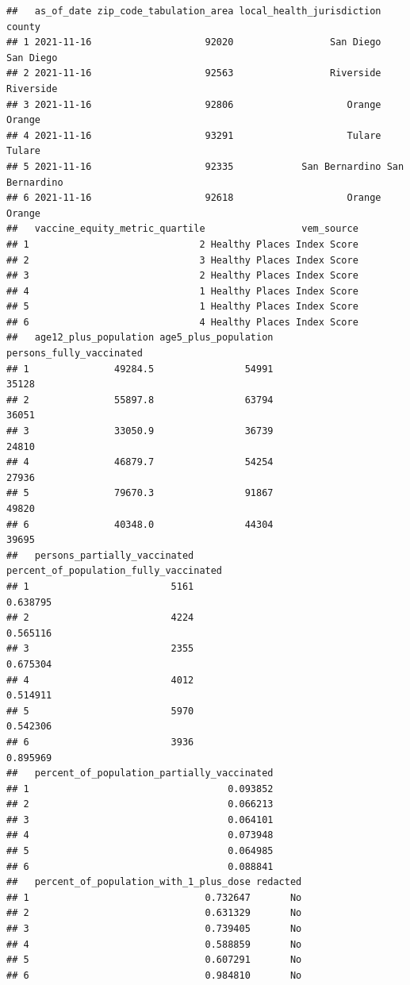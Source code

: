 \documentclass[
]{article}
\begin{document}
\begin{verbatim}
##   as_of_date zip_code_tabulation_area local_health_jurisdiction         county
## 1 2021-11-16                    92020                 San Diego      San Diego
## 2 2021-11-16                    92563                 Riverside      Riverside
## 3 2021-11-16                    92806                    Orange         Orange
## 4 2021-11-16                    93291                    Tulare         Tulare
## 5 2021-11-16                    92335            San Bernardino San Bernardino
## 6 2021-11-16                    92618                    Orange         Orange
##   vaccine_equity_metric_quartile                 vem_source
## 1                              2 Healthy Places Index Score
## 2                              3 Healthy Places Index Score
## 3                              2 Healthy Places Index Score
## 4                              1 Healthy Places Index Score
## 5                              1 Healthy Places Index Score
## 6                              4 Healthy Places Index Score
##   age12_plus_population age5_plus_population persons_fully_vaccinated
## 1               49284.5                54991                    35128
## 2               55897.8                63794                    36051
## 3               33050.9                36739                    24810
## 4               46879.7                54254                    27936
## 5               79670.3                91867                    49820
## 6               40348.0                44304                    39695
##   persons_partially_vaccinated percent_of_population_fully_vaccinated
## 1                         5161                               0.638795
## 2                         4224                               0.565116
## 3                         2355                               0.675304
## 4                         4012                               0.514911
## 5                         5970                               0.542306
## 6                         3936                               0.895969
##   percent_of_population_partially_vaccinated
## 1                                   0.093852
## 2                                   0.066213
## 3                                   0.064101
## 4                                   0.073948
## 5                                   0.064985
## 6                                   0.088841
##   percent_of_population_with_1_plus_dose redacted
## 1                               0.732647       No
## 2                               0.631329       No
## 3                               0.739405       No
## 4                               0.588859       No
## 5                               0.607291       No
## 6                               0.984810       No
\end{verbatim}
\end{document}
